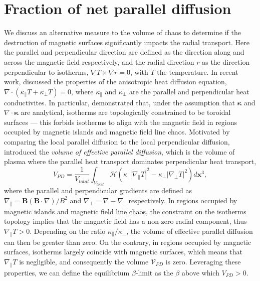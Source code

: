\documentclass[my_thesis.tex]{subfiles}
\begin{document}
\section{Fraction of net parallel diffusion}
We discuss an alternative measure to the volume of chaos to determine if the destruction of magnetic surfaces significantly impacts the radial transport. Here the parallel and perpendicular direction are defined as the direction along and across the magnetic field respectively, and the radial  direction $r$ as the direction perpendicular to isotherms, $\nabla T\times\nabla r=0$, with $T$ the temperature. In recent work, \citet{paulHeatConductionIrregular2022} discussed the properties of the anisotropic heat diffusion equation, $\nabla\cdot(\kappa_\parallel T + \kappa_\perp T)=0$, where $\kappa_\parallel$ and $\kappa_\perp$ are the parallel and perpendicular heat conductivites. In particular, \citeauthor{paulHeatConductionIrregular2022} demonstrated that, under the assumption that $\boldsymbol{\kappa}$ and $\nabla\cdot\boldsymbol{\kappa}$ are analytical, isotherms are topologically constrained to be toroidal surfaces --- this forbids isotherms to align with the magnetic field in regions occupied by magnetic islands and magnetic field line chaos. Motivated by comparing the local parallel diffusion to the local perpendicular diffusion, \citeauthor{paulHeatConductionIrregular2022} introduced the \emph{volume of effective parallel diffusion}, which is the volume of plasma where the parallel heat transport dominates perpendicular heat transport,
\begin{equation}
V_{PD} = \frac{1}{V_{total}} \int_{V_{total}}\mathcal{H}(\kappa_\parallel|\nabla_\parallel T|^2-\kappa_\perp|\nabla_\perp T|^2) d\mathbf{x}^3, \label{eq.paul_volume_effective_diffusion}
\end{equation}
where the parallel and perpendicular gradients are defined as $\nabla_\parallel=\mathbf{B}(\mathbf{B}\cdot\nabla) / B^2$ and $\nabla_\perp=\nabla-\nabla_\parallel$ respectively. In regions occupied by magnetic islands and magnetic field line chaos, the constraint on the isotherms topology implies that the magnetic field has a non-zero radial component, thus $\nabla_\parallel T> 0$. Depending on the ratio $\kappa_\parallel / \kappa_\perp$, the volume of effective parallel diffusion can then be greater than zero. On the contrary, in regions occupied by magnetic surfaces, isotherms largely coincide with magnetic surfaces, which means that $\nabla_\parallel T$ is negligible, and consequently the volume $\mathcal{V}_{PD}$ is zero. Leveraging these properties, we can define the equilibrium $\beta$-limit as the $\beta$ above which $V_{PD}>0$.
\end{document}
